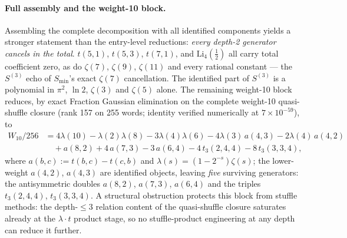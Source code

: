 \documentclass[11pt]{article}
\begin{document}
\paragraph{Full assembly and the weight-10 block.}
Assembling the complete decomposition with all identified components
yields a
stronger statement than the entry-level reductions: \emph{every
depth-2 generator cancels in the total}.  $t(5,1)$, $t(5,3)$,
$t(7,1)$, and $\mathrm{Li}_4(\tfrac12)$ all carry total coefficient
zero, as do $\zeta(7)$, $\zeta(9)$, $\zeta(11)$ and every rational
constant --- the $S^{(3)}$ echo of
$S_{\min}$'s exact $\zeta(7)$ cancellation.  The identified part of
$S^{(3)}$ is a polynomial in $\pi^2$, $\ln 2$, $\zeta(3)$ and
$\zeta(5)$ alone.  The remaining weight-10 block reduces, by exact Fraction
Gaussian elimination on the complete weight-10 quasi-shuffle closure
(rank 157 on 255 words; identity verified numerically at
$7\times10^{-59}$), to
\begin{align}
  W_{10}/256 &= 4\lambda(10) - \lambda(2)\lambda(8)
   - 3\lambda(4)\lambda(6) - 4\lambda(3)\,a(4,3)
   - 2\lambda(4)\,a(4,2) \nonumber\\
  &\quad + a(8,2) + 4\,a(7,3) - 3\,a(6,4)
   - 4\,t_3(2,4,4) - 8\,t_3(3,3,4),
  \label{eq:w10_reduction}
\end{align}
where $a(b,c) := t(b,c) - t(c,b)$ and $\lambda(s) = (1-2^{-s})\zeta(s)$;
the lower-weight $a(4,2)$, $a(4,3)$ are identified objects, leaving
\emph{five} surviving generators: the antisymmetric doubles $a(8,2)$,
$a(7,3)$, $a(6,4)$ and the triples $t_3(2,4,4)$, $t_3(3,3,4)$.  A
structural obstruction protects this block from stuffle methods: the
depth-$\le 3$ relation content of the quasi-shuffle closure saturates
already at the $\lambda\cdot t$ product stage, so no stuffle-product
engineering at any depth can reduce it further.
\end{document}

